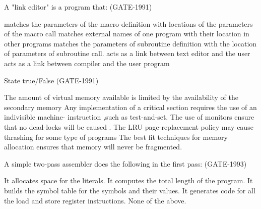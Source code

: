 
\begin{questyle}

  \question  A "link editor" is a program that: (GATE-1991)

  \begin{choices}
    \choice matches the parameters of the macro-definition with locations of the parameters of the macro call
    \choice matches external names of one program with their location in other programs
    \choice matches the parameters of subroutine definition with the location of parameters of subroutine call.
    \choice acts as a link between text editor and the user
    \choice acts as a link between compiler and the user program
  \end{choices}

\end{questyle}


\begin{questyle}

  \question  State true/False (GATE-1991)

  \begin{choices}
    \choice The amount of virtual memory available is limited by the availability of the secondary memory
    \choice Any implementation of a critical section requires the use of an indivisible machine- instruction ,such as test-and-set.
    \choice The use of monitors ensure that no dead-locks will be caused .
    \choice The LRU page-replacement policy may cause thrashing for some type of programs
    \choice The best fit techniques for memory allocation ensures that memory will never be fragmented.
  \end{choices}

\end{questyle}


\begin{questyle}

  \question A simple two-pass assembler does the following in the first pass: (GATE-1993)

  \begin{choices}
    \choice It allocates space for the literals.
    \choice It computes the total length of the program.
    \choice It builds the symbol table for the symbols and their values.
    \choice It generates code for all the load and store register instructions.
    \choice None of the above.
  \end{choices}

\end{questyle}

